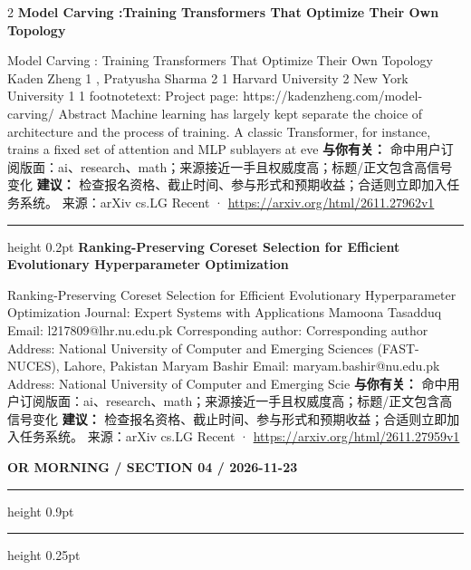 \documentclass[10.5pt]{ctexart}
\begin{document}
\begin{multicols}{2}
{\large\bfseries Model Carving :Training Transformers That Optimize Their Own Topology}\par
Model Carving : Training Transformers That Optimize Their Own Topology Kaden Zheng 1 , Pratyusha Sharma 2 1 Harvard University 2 New York University 1 1 footnotetext: Project page: https://kadenzheng.com/model-carving/ Abstract Machine learning has largely kept separate the choice of architecture and the process of training. A classic Transformer, for instance, trains a fixed set of attention and MLP sublayers at eve
\textbf{与你有关：} 命中用户订阅版面：ai、research、math；来源接近一手且权威度高；标题/正文包含高信号变化
\textbf{建议：} 检查报名资格、截止时间、参与形式和预期收益；合适则立即加入任务系统。
{\footnotesize\color{ormuted} 来源：arXiv cs.LG Recent · \url{https://arxiv.org/html/2611.27962v1}}
\vspace{2mm}
\hrule height 0.2pt
\vspace{2mm}
{\large\bfseries Ranking-Preserving Coreset Selection for Efficient Evolutionary Hyperparameter Optimization}\par
Ranking-Preserving Coreset Selection for Efficient Evolutionary Hyperparameter Optimization Journal: Expert Systems with Applications Mamoona Tasadduq Email: l217809@lhr.nu.edu.pk Corresponding author: Corresponding author Address: National University of Computer and Emerging Sciences (FAST-NUCES), Lahore, Pakistan Maryam Bashir Email: maryam.bashir@nu.edu.pk Address: National University of Computer and Emerging Scie
\textbf{与你有关：} 命中用户订阅版面：ai、research、math；来源接近一手且权威度高；标题/正文包含高信号变化
\textbf{建议：} 检查报名资格、截止时间、参与形式和预期收益；合适则立即加入任务系统。
{\footnotesize\color{ormuted} 来源：arXiv cs.LG Recent · \url{https://arxiv.org/html/2611.27959v1}}
\end{multicols}
\newpage
{\small\bfseries OR MORNING / SECTION 04 / 2026-11-23}
\vspace{2mm}
\hrule height 0.9pt
\vspace{1.5mm}
\hrule height 0.25pt
\vspace{4mm}
\end{document}
